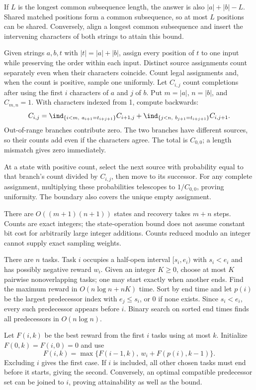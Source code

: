 If $L$ is the longest common subsequence length, the answer is also $|a|+|b|-L$. Shared matched positions form a common subsequence, so at most $L$ positions can be shared. Conversely, align a longest common subsequence and insert the intervening characters of both strings to attain this bound.

Given strings $a,b,t$ with $|t|=|a|+|b|$, assign every position of $t$ to one input while preserving the order within each input. Distinct source assignments count separately even when their characters coincide. Count legal assignments and, when the count is positive, sample one uniformly.
\solution Let $C_{i,j}$ count completions after using the first $i$ characters of $a$ and $j$ of $b$. Put $m=|a|$, $n=|b|$, and $C_{m,n}=1$. With characters indexed from 1, compute backwards:
\[
C_{i,j}=\ind_{\{i<m,\ a_{i+1}=t_{i+j+1}\}}C_{i+1,j}
       +\ind_{\{j<n,\ b_{j+1}=t_{i+j+1}\}}C_{i,j+1}.
\]
Out-of-range branches contribute zero. The two branches have different sources, so their counts add even if the characters agree. The total is $C_{0,0}$; a length mismatch gives zero immediately.

At a state with positive count, select the next source with probability equal to that branch's count divided by $C_{i,j}$, then move to its successor. For any complete assignment, multiplying these probabilities telescopes to $1/C_{0,0}$, proving uniformity. The boundary also covers the unique empty assignment.

There are $O((m+1)(n+1))$ states and recovery takes $m+n$ steps. Counts are exact integers; the state-operation bound does not assume constant bit cost for arbitrarily large integer additions. Counts reduced modulo an integer cannot supply exact sampling weights.

There are $n$ tasks. Task $i$ occupies a half-open interval $[s_i,e_i)$ with $s_i<e_i$ and has possibly negative reward $w_i$. Given an integer $K\ge0$, choose at most $K$ pairwise nonoverlapping tasks; one may start exactly when another ends. Find the maximum reward in $O(n\log n+nK)$ time.
\solution Sort by end time and let $p(i)$ be the largest predecessor index with $e_j\le s_i$, or 0 if none exists. Since $s_i<e_i$, every such predecessor appears before $i$. Binary search on sorted end times finds all predecessors in $O(n\log n)$.

Let $F(i,k)$ be the best reward from the first $i$ tasks using at most $k$. Initialize $F(0,k)=F(i,0)=0$ and use
\[
F(i,k)=\max\{F(i-1,k),\ w_i+F(p(i),k-1)\}.
\]
Excluding $i$ gives the first case. If $i$ is included, all other chosen tasks must end before it starts, giving the second. Conversely, an optimal compatible predecessor set can be joined to $i$, proving attainability as well as the bound.

